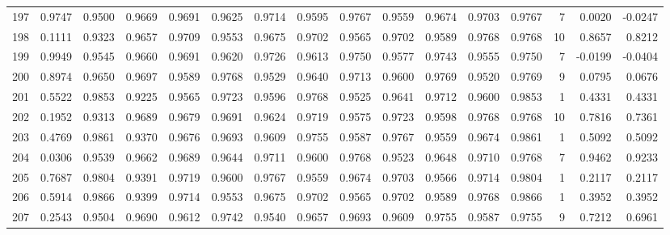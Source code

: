 \begin{tabular}{lrrrrrrrrrrrrrrr}
197 &      0.9747 &  0.9500 &  0.9669 &  0.9691 &  0.9625 &  0.9714 &  0.9595 &  0.9767 &  0.9559 &  0.9674 &   0.9703 &     0.9767 &      7 &                    0.0020 &                    -0.0247 \\
198 &      0.1111 &  0.9323 &  0.9657 &  0.9709 &  0.9553 &  0.9675 &  0.9702 &  0.9565 &  0.9702 &  0.9589 &   0.9768 &     0.9768 &     10 &                    0.8657 &                     0.8212 \\
199 &      0.9949 &  0.9545 &  0.9660 &  0.9691 &  0.9620 &  0.9726 &  0.9613 &  0.9750 &  0.9577 &  0.9743 &   0.9555 &     0.9750 &      7 &                   -0.0199 &                    -0.0404 \\
200 &      0.8974 &  0.9650 &  0.9697 &  0.9589 &  0.9768 &  0.9529 &  0.9640 &  0.9713 &  0.9600 &  0.9769 &   0.9520 &     0.9769 &      9 &                    0.0795 &                     0.0676 \\
201 &      0.5522 &  0.9853 &  0.9225 &  0.9565 &  0.9723 &  0.9596 &  0.9768 &  0.9525 &  0.9641 &  0.9712 &   0.9600 &     0.9853 &      1 &                    0.4331 &                     0.4331 \\
202 &      0.1952 &  0.9313 &  0.9689 &  0.9679 &  0.9691 &  0.9624 &  0.9719 &  0.9575 &  0.9723 &  0.9598 &   0.9768 &     0.9768 &     10 &                    0.7816 &                     0.7361 \\
203 &      0.4769 &  0.9861 &  0.9370 &  0.9676 &  0.9693 &  0.9609 &  0.9755 &  0.9587 &  0.9767 &  0.9559 &   0.9674 &     0.9861 &      1 &                    0.5092 &                     0.5092 \\
204 &      0.0306 &  0.9539 &  0.9662 &  0.9689 &  0.9644 &  0.9711 &  0.9600 &  0.9768 &  0.9523 &  0.9648 &   0.9710 &     0.9768 &      7 &                    0.9462 &                     0.9233 \\
205 &      0.7687 &  0.9804 &  0.9391 &  0.9719 &  0.9600 &  0.9767 &  0.9559 &  0.9674 &  0.9703 &  0.9566 &   0.9714 &     0.9804 &      1 &                    0.2117 &                     0.2117 \\
206 &      0.5914 &  0.9866 &  0.9399 &  0.9714 &  0.9553 &  0.9675 &  0.9702 &  0.9565 &  0.9702 &  0.9589 &   0.9768 &     0.9866 &      1 &                    0.3952 &                     0.3952 \\
207 &      0.2543 &  0.9504 &  0.9690 &  0.9612 &  0.9742 &  0.9540 &  0.9657 &  0.9693 &  0.9609 &  0.9755 &   0.9587 &     0.9755 &      9 &                    0.7212 &                     0.6961 \\

\end{tabular}
